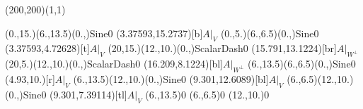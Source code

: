 \unitlength=1bp%

\begin{feynartspicture}(200,200)(1,1)

\FADiagram{}
\FAProp(0.,15.)(6.,13.5)(0.,){Sine}{0}
\FALabel(3.37593,15.2737)[b]{$A|_V$}
\FAProp(0.,5.)(6.,6.5)(0.,){Sine}{0}
\FALabel(3.37593,4.72628)[t]{$A|_V$}
\FAProp(20,15.)(12.,10.)(0.,){ScalarDash}{0}
\FALabel(15.791,13.1224)[br]{$A|_{W^\perp}$}
\FAProp(20,5.)(12.,10.)(0.,){ScalarDash}{0}
\FALabel(16.209,8.1224)[bl]{$A|_{W^\perp}$}
\FAProp(6.,13.5)(6.,6.5)(0.,){Sine}{0}
\FALabel(4.93,10.)[r]{$A|_V$}
\FAProp(6.,13.5)(12.,10.)(0.,){Sine}{0}
\FALabel(9.301,12.6089)[bl]{$A|_V$}
\FAProp(6.,6.5)(12.,10.)(0.,){Sine}{0}
\FALabel(9.301,7.39114)[tl]{$A|_V$}
\FAVert(6.,13.5){0}
\FAVert(6.,6.5){0}
\FAVert(12.,10.){0}
\end{feynartspicture}

